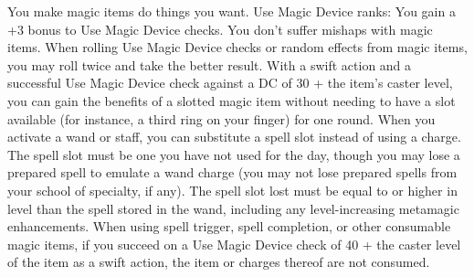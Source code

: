 \skillfeat
{You make magic items do things you want.}
{Use Magic Device ranks:}
{You gain a +3 bonus to Use Magic Device checks.}
{You don't suffer mishaps with magic items.}
{When rolling Use Magic Device checks or random effects from magic items, you may roll twice and take the better result.}
{With a swift action and a successful Use Magic Device check against a DC of 30 + the item's caster level, you can gain the benefits of a slotted magic item without needing to have a slot available (for instance, a third ring on your finger) for one round.}
{When you activate a wand or staff, you can substitute a spell slot instead of using a charge. The spell slot must be one you have not used for the day, though you may lose a prepared spell to emulate a wand charge (you may not lose prepared spells from your school of specialty, if any). The spell slot lost must be equal to or higher in level than the spell stored in the wand, including any level-increasing metamagic enhancements. When using spell trigger, spell completion, or other consumable magic items, if you succeed on a Use Magic Device check of 40 + the caster level of the item as a swift action, the item or charges thereof are not consumed.}